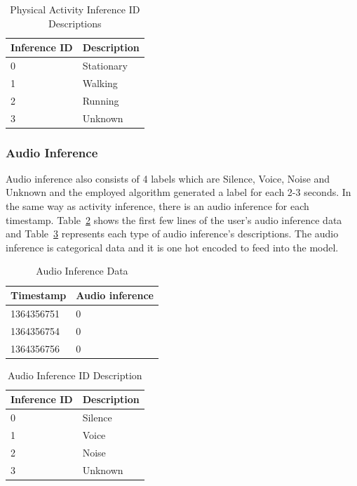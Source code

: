 \documentclass[12pt,oneandhalf,chaparabic,lfm,phd,eng,oneside,pntc]{gsufbe}
\begin{document}
\begin{table}[b!]
\centering
\caption{Physical Activity Inference ID Descriptions}
\label{tab:Activity Inference IDs}
\begin{tabular}{|l|l|}
\hline
Inference ID & Description \\ \hline
0            & Stationary  \\
1            & Walking     \\
2            & Running     \\
3            & Unknown     \\ \hline
\end{tabular}
\end{table}


\subsubsection{Audio Inference}
\label{subsubsec:Audio Inference}
Audio inference also consists of 4 labels which are Silence, Voice, Noise and Unknown and the employed algorithm generated a label for each 2-3 seconds. In the same way as activity inference, there is an audio inference for each timestamp. Table~\ref{tab:Audio Inference} shows the first few lines of the user's audio inference data and Table~\ref{tab:Audio Inference IDs} represents each type of audio inference's descriptions. The audio inference is categorical data and it is one hot encoded to feed into the model.

\begin{table}[b!]
\centering
\caption{Audio Inference Data}
\label{tab:Audio Inference}
\begin{tabular}{|l|l|}
\hline
Timestamp  & Audio inference \\ \hline
1364356751 & 0               \\
1364356754 & 0               \\
1364356756 & 0               \\ \hline
\end{tabular}
\end{table}

\begin{table}[b!]
\centering
\caption{Audio Inference ID Description}
\label{tab:Audio Inference IDs}
\begin{tabular}{|l|l|}
\hline
Inference ID & Description \\ \hline
0            & Silence     \\
1            & Voice       \\
2            & Noise       \\
3            & Unknown     \\ \hline
\end{tabular}
\end{table}
\end{document}
